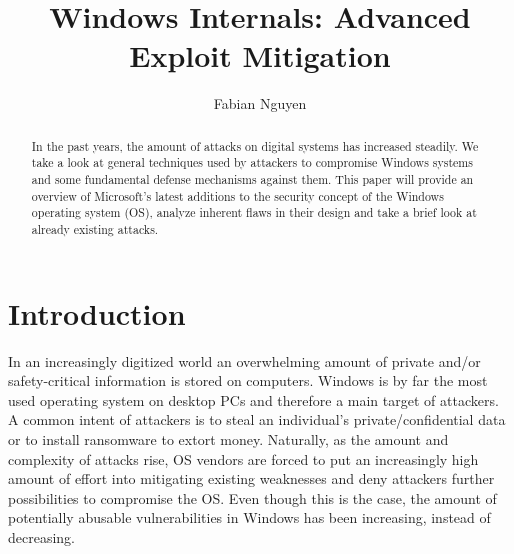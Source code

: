\documentclass[10pt,twocolumn,a4paper]{article}
\author{Fabian Nguyen}
\begin{document}
\title{Windows Internals: Advanced Exploit Mitigation}

\maketitle


\begin{abstract}
In the past years, the amount of attacks on digital systems has increased steadily.
We take a look at general techniques used by attackers to compromise Windows systems and some fundamental defense mechanisms against them.
This paper will provide an overview of Microsoft's latest additions to the security concept of the Windows operating system (OS), analyze inherent flaws in their design and take a brief look at already existing attacks. 
\end{abstract}

\section{Introduction}\label{sec:introduction}
In an increasingly digitized world an overwhelming amount of private and/or safety-critical information is stored on computers.
Windows is by far the most used operating system on desktop PCs \cite{OSshare} and therefore a main target of attackers.
A common intent of attackers is to steal an individual's private/confidential data or to install ransomware to extort money.
Naturally, as the amount and complexity of attacks rise, OS vendors are forced to put an increasingly high amount of effort into mitigating existing weaknesses and deny attackers further possibilities to compromise the OS.
Even though this is the case, the amount of potentially abusable vulnerabilities in Windows has been increasing, instead of decreasing.
\end{document}
